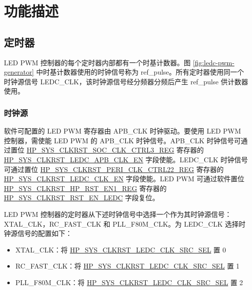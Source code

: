 \documentclass[main\_\_CN.tex]{subfiles}
\begin{document}
\section{功能描述}
\subsection{定时器}\label{sec:ledc-timers}

LED PWM 控制器的每个定时器内部都有一个时基计数器。图 \ref{fig:ledc-pwm-generator} 中时基计数器使用的时钟信号称为 ref\_pulse。所有定时器使用同一个时钟源信号 LEDC\_CLK，该时钟源信号经分频器分频后产生 ref\_pulse 供计数器使用。

\subsubsection{时钟源}

    {软件可配置的 LED PWM 寄存器由 APB\_CLK 时钟驱动。要使用 LED PWM 控制器，需使能 LED PWM 的 APB\_CLK 时钟信号。APB\_CLK 时钟信号可通过置位 \hyperref[regdesc:HPSYSCLKRSTSOCCLKCTRL3REG]{HP\_SYS\_CLKRST\_SOC\_CLK\_CTRL3\_REG} 寄存器的 \hyperref[fielddesc:HPSYSCLKRSTLEDCAPBCLKEN]{HP\_SYS\_CLKRST\_LEDC\_APB\_CLK\_EN} 字段使能。LEDC\_CLK 时钟信号可通过置位 \hyperref[regdesc:HPSYSCLKRSTPERICLKCTRL22REG]{HP\_SYS\_CLKRST\_PERI\_CLK\_CTRL22\_REG} 寄存器的 \hyperref[fielddesc:HPSYSCLKRSTLEDCCLKEN]{HP\_SYS\_CLKRST\_LEDC\_CLK\_EN} 字段使能。LED PWM 可通过软件置位 \hyperref[regdesc:HPSYSCLKRSTHPRSTEN1REG]{HP\_SYS\_CLKRST\_HP\_RST\_EN1\_REG} 寄存器的 \hyperref[fielddesc:HPSYSCLKRSTRSTENLEDC]{HP\_SYS\_CLKRST\_RST\_EN\_LEDC} 字段复位。}

LED PWM 控制器的定时器从下述时钟信号中选择一个作为其时钟源信号：XTAL\_CLK，RC\_FAST\_CLK 和 PLL\_F80M\_CLK。为 LEDC\_CLK 选择时钟源信号的配置如下：

\begin{itemize}
    \item XTAL\_CLK：将 \hyperref[fielddesc:HPSYSCLKRSTLEDCCLKSRCSEL]{HP\_SYS\_CLKRST\_LEDC\_CLK\_SRC\_SEL} 置 0
    \item RC\_FAST\_CLK：将 \hyperref[fielddesc:HPSYSCLKRSTLEDCCLKSRCSEL]{HP\_SYS\_CLKRST\_LEDC\_CLK\_SRC\_SEL} 置 1
    \item PLL\_F80M\_CLK：将 \hyperref[fielddesc:HPSYSCLKRSTLEDCCLKSRCSEL]{HP\_SYS\_CLKRST\_LEDC\_CLK\_SRC\_SEL} 置 2
\end{itemize}
\end{document}
